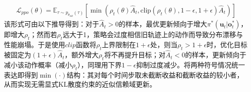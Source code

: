 \begin{equation}
\begin{aligned}
\mathcal{L}_{ppo}(\theta)=\mathbb{E}_{\tau\sim p_{\theta_{old}}(\tau)}\left[\min\left(\rho_t(\theta) \hat{A}_t, \text{clip}\left(\rho_t(\theta), 1-\epsilon, 1+\epsilon\right) \hat{A}_t\right)\right]
\end{aligned}
\label{equ:ppo2}
\end{equation}
该形式可由以下推导得到：对于$\hat{A}_t>0$的样本，最优更新倾向于增大$\pi^\ast(\boldsymbol{u}_t|\boldsymbol{o}^{\ast}_t)$，即增大$\rho_t$；然而若$\rho_t$远大于1，策略会过度相信旧轨迹上的动作而导致分布漂移与性能崩塌。于是使用$clip$函数将$\rho_t$上界限制在$1+\epsilon$处，则当$\rho_t>1+\epsilon$时，优化目标被固定为$(1+\epsilon)\hat{A}_t$，额外增大$\rho_t$将不再提升目标；对$\hat{A}_t<0$的样本，更新倾向于减小该动作概率（减小$\rho_t$），同理用下界$1-\epsilon$抑制过度减少。将两种符号情况统一表达即得到$\min(\cdot)$结构：其对每个时间步取未截断收益和截断收益的较小者，从而实现无需显式KL散度约束的近似信赖域更新。

